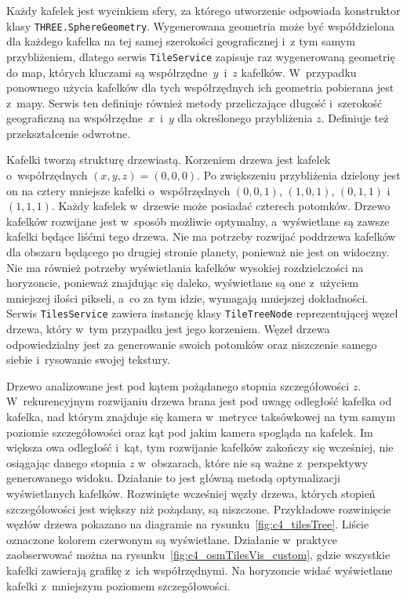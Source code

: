 Każdy kafelek jest wycinkiem sfery, za którego utworzenie odpowiada konstruktor klasy \texttt{THREE.SphereGeometry}. Wygenerowana geometria może być współdzielona dla każdego kafelka na tej samej szerokości geograficznej i~z tym samym przybliżeniem, dlatego serwis \texttt{TileService} zapisuje raz wygenerowaną geometrię do map, których kluczami są współrzędne~$y$~i~$z$ kafelków. W~przypadku ponownego użycia kafelków dla tych współrzędnych ich geometria pobierana jest z~mapy. Serwis ten definiuje również metody przeliczające długość i~szerokość geograficzną na współrzędne~$x$~i~$y$ dla określonego przybliżenia $z$. Definiuje też przekształcenie odwrotne.

Kafelki tworzą strukturę drzewiastą. Korzeniem drzewa jest kafelek o~współrzędnych $(x, y, z) = (0,0,0)$. Po zwiększeniu przybliżenia dzielony jest on na cztery mniejsze kafelki o~współrzędnych $(0,0,1)$, $(1,0,1)$, $(0,1,1)$ i~$(1,1,1)$. Każdy kafelek w~drzewie może posiadać czterech potomków. Drzewo kafelków rozwijane jest w~sposób możliwie optymalny, a~wyświetlane są zawsze kafelki będące liśćmi tego drzewa. Nie ma potrzeby rozwijać poddrzewa kafelków dla obszaru będącego po drugiej stronie planety, ponieważ nie jest on widoczny. Nie ma również potrzeby wyświetlania kafelków wysokiej rozdzielczości na horyzoncie, ponieważ znajdując się daleko, wyświetlane są one z~użyciem mniejszej ilości pikseli, a~co za tym idzie, wymagają mniejszej dokładności. Serwis \texttt{TilesService} zawiera instancję klasy \texttt{TileTreeNode} reprezentującej węzeł drzewa, który w~tym przypadku jest jego korzeniem. Węzeł drzewa odpowiedzialny jest za generowanie swoich potomków oraz niszczenie samego siebie i~rysowanie swojej tekstury.

Drzewo analizowane jest pod kątem pożądanego stopnia szczegółowości $z$. W~rekurencyjnym rozwijaniu drzewa brana jest pod uwagę odległość kafelka od kafelka, nad którym znajduje się kamera w~metryce taksówkowej na tym samym poziomie szczegółowości oraz kąt pod jakim kamera spogląda na kafelek. Im większa owa odległość i~kąt, tym rozwijanie kafelków zakończy się wcześniej, nie osiągając danego stopnia $z$ w~obszarach, które nie są ważne z~perspektywy generowanego widoku. Działanie to jest główną metodą optymalizacji wyświetlanych kafelków. Rozwinięte wcześniej węzły drzewa, których stopień szczegółowości jest większy niż pożądany, są niszczone. Przykładowe rozwinięcie węzłów drzewa pokazano na diagramie na rysunku~\ref{fig:c4_tilesTree}. Liście oznaczone kolorem czerwonym są wyświetlane. Działanie w~praktyce zaobserwować można na rysunku~\ref{fig:c4_osmTilesVis_custom}, gdzie wszystkie kafelki zawierają grafikę z~ich współrzędnymi. Na horyzoncie widać wyświetlane kafelki z~mniejszym poziomem szczegółowości. 

